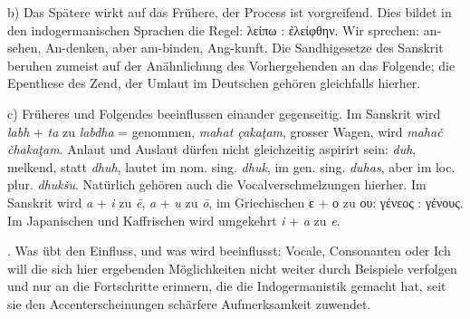 {b) Das Spätere wirkt auf das Frühere, der Process ist vorgreifend. Dies bildet in den indogermanischen Sprachen die Regel: λείπω : ἐλείφθην. Wir sprechen: an-sehen, An-denken, aber am-binden, Ang-kunft. Die Sandhigesetze des Sanskrit beruhen zumeist auf der Anähnlichung des Vorhergehenden an das Folgende; die Epenthese des Zend, der Umlaut im Deutschen gehören gleichfalls hierher.

c) Früheres und Folgendes beeinflussen einander gegenseitig. Im Sanskrit wird \textit{labh} + \textit{ta} zu \textit{labdha} = genommen, \textit{mahat çakaţam}, grosser Wagen, wird \textit{mahač čhakaţam}. Anlaut und Auslaut dürfen nicht gleichzeitig aspirirt sein: \textit{duh}, melkend, statt \textit{dhuh}, lautet im nom. sing. \textit{dhuk}, im gen. sing. \textit{duhas}, aber im loc. plur. \textit{dhukšu}. Natürlich gehören auch die Vocalverschmelzungen hierher. Im Sanskrit wird \textit{a} + \textit{i} zu \textit{ē}, \textit{a} + \textit{u} zu \textit{ō}, im Griechischen ε + ο zu ου: γένεος : γένους. Im Japanischen und Kaffrischen wird umgekehrt \textit{i} + \textit{a} zu \textit{e}.

. Was übt den Einfluss, und was wird beeinflusst: Vocale, Consonanten oder   Ich will die sich hier ergebenden Möglichkeiten nicht weiter durch Beispiele verfolgen und nur an die Fortschritte \label{fp.206} erinnern, die die Indogermanistik gemacht hat, seit sie den Accenterscheinungen schärfere Aufmerksamkeit zuwendet. 

}
